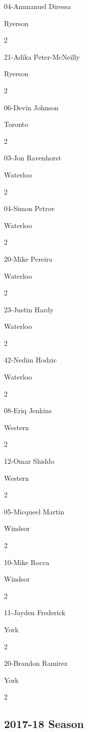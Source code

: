 \documentclass[]{book}
\begin{document}
04-Ammanuel Diressa

Ryerson

2

21-Adika Peter-McNeilly

Ryerson

2

06-Devin Johnson

Toronto

2

03-Jon Ravenhorst

Waterloo

2

04-Simon Petrov

Waterloo

2

20-Mike Pereira

Waterloo

2

23-Justin Hardy

Waterloo

2

42-Nedim Hodzic

Waterloo

2

08-Eriq Jenkins

Western

2

12-Omar Shiddo

Western

2

05-Micqueel Martin

Windsor

2

10-Mike Rocca

Windsor

2

11-Jayden Frederick

York

2

20-Brandon Ramirez

York

2

\hypertarget{season-2}{%
\subsection{2017-18 Season}\label{season-2}}
\end{document}
